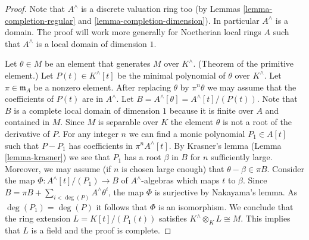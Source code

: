 \documentclass[10pt,a4paper]{amsart}
\theoremstyle{plain}
\theoremstyle{definition}
\theoremstyle{remark}
\numberwithin{equation}{subsection}
\begin{document}
\begin{proof}
Note that $A^\wedge$ is a discrete valuation ring too (by
Lemmas \ref{lemma-completion-regular} and \ref{lemma-completion-dimension}).
In particular $A^\wedge$ is a domain. The proof will work more generally
for Noetherian local rings $A$ such that $A^\wedge$ is a local domain
of dimension $1$.

\medskip\noindent
Let $\theta \in M$ be an element that generates $M$ over $K^\wedge$.
(Theorem of the primitive element.)
Let $P(t) \in K^\wedge[t]$ be the minimal polynomial of $\theta$ over
$K^\wedge$. Let $\pi \in \mathfrak m_A$ be a nonzero element.
After replacing $\theta$ by $\pi^n\theta$ we may assume that
the coefficients of $P(t)$ are in $A^\wedge$. Let
$B = A^\wedge[\theta] = A^\wedge[t]/(P(t))$. Note that $B$ is
a complete local domain of dimension $1$ because it is finite over $A$ and
contained in $M$. Since $M$ is separable over $K$ the element $\theta$
is not a root of the derivative of $P$. For any integer $n$ we can find
a monic polynomial $P_1 \in A[t]$ such that $P - P_1$ has coefficients in
$\pi^nA^\wedge[t]$. By Krasner's lemma (Lemma \ref{lemma-krasner}) we see that
$P_1$ has a root $\beta$ in $B$ for $n$ sufficiently large.
Moreover, we may assume (if $n$ is chosen large enough)
that $\theta - \beta \in \pi B$. Consider the map
$\Phi : A^\wedge[t]/(P_1) \to B$ of $A^\wedge$-algebras
which maps $t$ to $\beta$. Since
$B = \pi B + \sum_{i < \deg(P)} A^\wedge \theta^i$, the map $\Phi$
is surjective by Nakayama's lemma. As $\deg(P_1) = \deg(P)$ it
follows that $\Phi$ is an isomorphism. We conclude that the ring
extension $L = K[t]/(P_1(t))$ satisfies $K^\wedge \otimes_K L \cong M$.
This implies that $L$ is a field and the proof is complete.
\end{proof}
\end{document}
